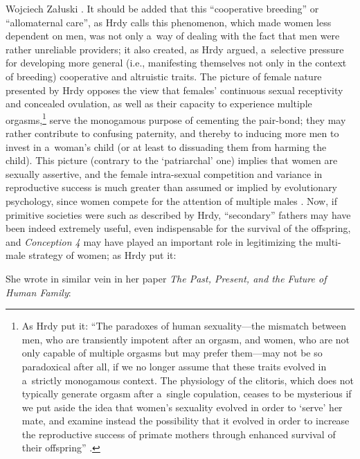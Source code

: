 \begin{artengenv}{Wojciech Załuski}
\parencite[][p.101]{hrdy_past_2001}. %
 It should be added that this ``cooperative breeding'' or ``allomaternal care'', as Hrdy calls this phenomenon, which made women less dependent on men, was not only a~way of dealing with the fact that men were rather unreliable providers; it also created, as Hrdy 
\parencite*[][]{hrdy_mothers_2009} %
 argued, a~selective pressure for developing more general (i.e., manifesting themselves not only in the context of breeding) cooperative and altruistic traits. The picture of female nature presented by Hrdy opposes the view that females' continuous sexual receptivity and concealed ovulation, as well as their capacity to experience multiple orgasms,\footnote{As Hrdy put it: ``The paradoxes of human sexuality---the mismatch between men, who are transiently impotent after an orgasm, and women, who are not only capable of multiple orgasms but may prefer them---may not be so paradoxical after all, if we no longer assume that these traits evolved in a~strictly monogamous context. The physiology of the clitoris, which does not typically generate orgasm after a~single copulation, ceases to be mysterious if we put aside the idea that women's sexuality evolved in order to ‘serve' her mate, and examine instead the possibility that it evolved in order to increase the reproductive success of primate mothers through enhanced survival of their offspring'' 
\parencite[][p.176]{hrdy_woman_1999}.%
} serve the monogamous purpose of cementing the pair-bond; they may rather contribute to confusing paternity, and thereby to inducing more men to invest in a~woman's child (or at least to dissuading them from harming the child). This picture (contrary to the ‘patriarchal' one) implies that women are sexually assertive, and the female intra-sexual competition and variance in reproductive success is much greater than assumed or implied by evolutionary psychology, since women compete for the attention of multiple males 
\parencite[cf.][p.132]{hrdy_woman_1999}. %
 Now, if primitive societies were such as described by Hrdy, ``secondary'' fathers may have been indeed extremely useful, even indispensable for the survival of the offspring, and \textit{Conception 4} may have played an important role in legitimizing the multi-male strategy of women; as Hrdy put it:

She wrote in similar vein in her paper \textit{The Past, Present, and the Future of Human Family}:


\end{artengenv}

